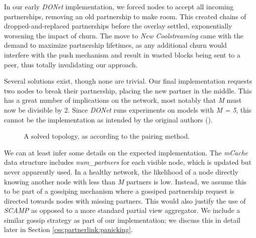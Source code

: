 \documentclass[12pt,a4paper]{article}
\begin{document}
In our early \textit{DONet} implementation, we forced nodes to accept all incoming partnerships, removing an old partnership to make room. This created chains of dropped-and-replaced partnerships before the overlay settled, exponentially worsening the impact of churn. The move to \textit{New Coolstreaming} came with the demand to maximize partnership lifetimes, as any additional churn would interfere with the push mechanism and result in wasted blocks being sent to a peer, thus totally invalidating our approach.

Several solutions exist, though none are trivial. Our final implementation requests two nodes to break their partnership, placing the new partner in the middle. This has a great number of implications on the network, most notably that \textit{M} must now be divisible by 2. Since \textit{DONet} runs experiments on models with \textit{M = 5}, this cannot be the implementation as intended by the original authors (\cite{Zhang2005}).

\begin{figure}[!ht]
	\centering
	\caption{A solved topology, as according to the pairing method.}
	\label{fig2}
\end{figure}

We can at least infer some details on the expected implementation. The \textit{mCache} data structure includes \textit{num\_partners} for each visible node, which is updated but never apparently used. In a healthy network, the likelihood of a node directly knowing another node with less than \textit{M} partners is low. Instead, we assume this to be part of a gossiping mechanism where a gossiped partnership request is directed towards nodes with missing partners. This would also justify the use of \textit{SCAMP} as opposed to a more standard partial view aggregator. We include a similar gossip strategy as part of our implementation; we discuss this in detail later in Section \ref{css:partnerlink:panicking}.
\end{document}
